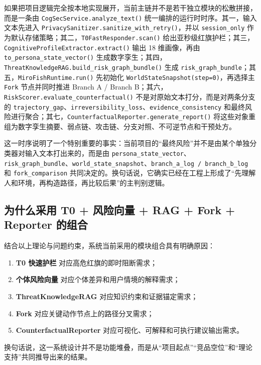 \documentclass[12pt,a4paper]{ctexart}
\begin{document}
如果把项目逻辑完全按本地实现展开，当前主链并不是若干独立模块的松散拼接，而是一条由 \texttt{CogSecService.analyze\_text()} 统一编排的运行时时序。其一，输入文本先进入 \texttt{PrivacySanitizer.sanitize\_with\_retry()}，并以 \texttt{session\_only} 作为默认存储策略；其二，\texttt{T0FastResponder.scan()} 给出亚秒级红旗护栏；其三，\texttt{CognitiveProfileExtractor.extract()} 输出 18 维画像，再由 \texttt{to\_persona\_state\_vector()} 生成数字孪生；其四，\texttt{ThreatKnowledgeRAG.build\_risk\_graph\_bundle()} 生成 \texttt{risk\_graph\_bundle}；其五，\texttt{MiroFishRuntime.run()} 先初始化 \texttt{WorldStateSnapshot(step=0)}，再选择主 \texttt{Fork} 节点并同时推进 Branch A / Branch B；其六，\texttt{RiskScorer.evaluate\_counterfactual()} 不是对原始文本打分，而是对两条分支的 \texttt{trajectory\_gap}、\texttt{irreversibility\_loss}、\texttt{evidence\_consistency} 和最终风险进行聚合；其七，\texttt{CounterfactualReporter.generate\_report()} 将这些对象重组为数字孪生摘要、弱点链、攻击链、分支对照、不可逆节点和干预处方。

这一时序说明了一个特别重要的事实：当前项目的“最终风险”并不是由某个单独分类器对输入文本打出来的，而是由 \texttt{persona\_state\_vector}、\texttt{risk\_graph\_bundle}、\texttt{world\_state\_snapshot}、\texttt{branch\_a\_log / branch\_b\_log} 和 \texttt{fork\_comparison} 共同决定的。换句话说，它确实已经在工程上形成了“先理解人和环境，再构造路径，再比较后果”的主判别逻辑。

\subsection{为什么采用 T0 + 风险向量 + RAG + Fork + Reporter 的组合}

结合以上理论与问题约束，系统当前采用的模块组合具有明确原因：
\begin{enumerate}[leftmargin=2em]
  \item \textbf{T0 快速护栏} 对应高危红旗的即时阻断需求；
  \item \textbf{个体风险向量} 对应个体差异和用户情境的解释需求；
  \item \textbf{ThreatKnowledgeRAG} 对应知识约束和证据锚定需求；
  \item \textbf{Fork} 对应关键动作节点上的路径分叉需求；
  \item \textbf{CounterfactualReporter} 对应可视化、可解释和可执行建议输出需求。
\end{enumerate}

换句话说，这一系统设计并不是功能堆叠，而是从“项目起点”“竞品空位”和“理论支持”共同推导出来的结果。
\end{document}
